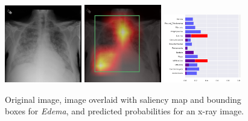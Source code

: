 \documentclass[8pt]{beamer}
\begin{document}
\begin{frame}
\begin{figure}[H]
  \centering
  \includegraphics[width=0.3\textwidth]{images/preds/edema}\hspace{0.01\textwidth}%
  \includegraphics[width=0.3\textwidth]{images/preds/edema_cam}\hspace{0.01\textwidth}%
  \includegraphics[width=0.3\textwidth]{images/preds/edema_probs}\\[0.01\textwidth]
  \caption{Original image, image overlaid with saliency map and bounding boxes
    for \emph{Edema}, and predicted probabilities for an x-ray image.}
  \label{examples_10}
\end{figure}
\end{frame}
\end{document}

